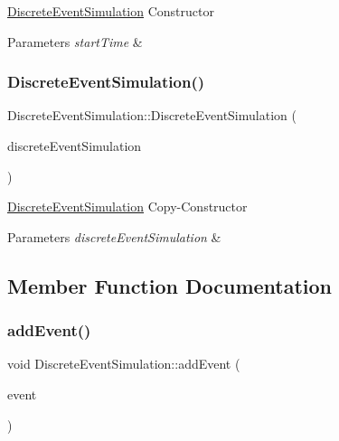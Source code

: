 \hyperlink{classDiscreteEventSimulation}{Discrete\+Event\+Simulation} Constructor 
\begin{DoxyParams}{Parameters}
{\em start\+Time} & \\
\hline
\end{DoxyParams}
\mbox{\label{classDiscreteEventSimulation_aa92e10279fe95449f35139a4893192f5}} 
\subsubsection{\texorpdfstring{Discrete\+Event\+Simulation()}{DiscreteEventSimulation()}\hspace{0.1cm}{\footnotesize\ttfamily [2/2]}}
{\footnotesize\ttfamily Discrete\+Event\+Simulation\+::\+Discrete\+Event\+Simulation (\begin{DoxyParamCaption}\item[{const \hyperlink{classDiscreteEventSimulation}{Discrete\+Event\+Simulation} \&}]{discrete\+Event\+Simulation }\end{DoxyParamCaption})}

\hyperlink{classDiscreteEventSimulation}{Discrete\+Event\+Simulation} Copy-\/\+Constructor 
\begin{DoxyParams}{Parameters}
{\em discrete\+Event\+Simulation} & \\
\hline
\end{DoxyParams}


\subsection{Member Function Documentation}
\mbox{\label{classDiscreteEventSimulation_a03770d2464931bc3555d4f34379aaa1e}} 
\subsubsection{\texorpdfstring{add\+Event()}{addEvent()}}
{\footnotesize\ttfamily void Discrete\+Event\+Simulation\+::add\+Event (\begin{DoxyParamCaption}\item[{\hyperlink{classEvent}{Event} $\ast$}]{event }\end{DoxyParamCaption})}

